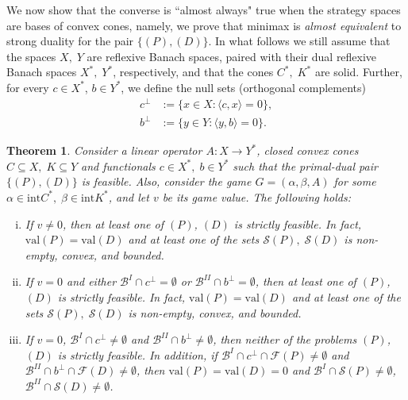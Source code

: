 \documentclass[11pt, twoside]{article}
\numberwithin{equation}{section}
\newtheorem{theorem}{Theorem}[section]
\theoremstyle{definition}
\begin{document}
We now show that the converse is ``almost always" true when the strategy spaces are bases of convex cones, namely, we prove that minimax is \textit{almost equivalent} to strong duality for the pair \hyperlink{primaldual}{$\{(P),(D)\}$}. In what follows we still assume that the spaces $X,\;Y$ are reflexive Banach spaces, paired with their dual reflexive Banach spaces $X^*,\;Y^*$, respectively, and that the cones $C^*,\;K^*$ are solid. Further, for every $c\in X^*$, $b\in Y^*$, we define the null sets (orthogonal complements)
\begin{subequations}
\begin{align}
c^{\perp}&:= \{x\in X:\langle c,x\rangle=0\},\\ 
b^{\perp}&:= \{y\in Y: \langle y,b\rangle=0\}.
\end{align}
\end{subequations}

\begin{theorem}\label{th:4.1}
    Consider a linear operator $A:X\rightarrow Y^*$, closed convex cones $C\subseteq X,\;K\subseteq Y$ and functionals $c\in X^*,\;b\in Y^*$ such that the primal-dual pair \hyperlink{primaldual}{$\{(P),(D)\}$} is feasible. Also, consider the game $G=(\alpha,\beta,A)$ for some $\alpha\in\text{int} C^*,\;\beta\in\text{int}K^*$, and let $v$ be its game value. The following holds:\vspace{-0.2cm}
    \begin{enumerate}[(i)]
        \item If $v\neq0$, then at least one of \hyperlink{primal}{$(P)$}, \hyperlink{dual}{$(D)$} is strictly feasible. In fact, $\text{val}(P)=\text{val}(D)$ and at least one of the sets $\mathcal{S}(P),\;\mathcal{S}(D)$ is non-empty, convex, and bounded.\vspace{-0.1cm}
        \item If $v=0$ and either $\mathcal{B}^{I}\cap c^{\perp}=\emptyset$ or $\mathcal{B}^{II}\cap b^{\perp}=\emptyset$, then at least one of \hyperlink{primal}{$(P)$}, \hyperlink{dual}{$(D)$} is strictly feasible. In fact, $\text{val}(P)=\text{val}(D)$ and at least one of the sets $\mathcal{S}(P),\;\mathcal{S}(D)$ is non-empty, convex, and bounded.\vspace{-0.1cm}
        \item If $v=0$, $\mathcal{B}^{I}\cap c^{\perp}\neq\emptyset$ and $\mathcal{B}^{II}\cap b^{\perp}\neq\emptyset$, then neither of the problems \hyperlink{primal}{$(P)$}, \hyperlink{dual}{$(D)$} is strictly feasible. In addition, if $\mathcal{B}^{I}\cap c^{\perp}\cap\mathcal{F}(P)\neq\emptyset$ and $\mathcal{B}^{II}\cap  b^{\perp}\cap\mathcal{F}(D)\neq\emptyset$, then $\text{val}(P)=\text{val}(D)=0$ and $\mathcal{B}^{I}\cap\mathcal{S}(P)\neq\emptyset$, $\mathcal{B}^{II}\cap\mathcal{S}(D)\neq\emptyset$.\\
    \end{enumerate}
\end{theorem}
\end{document}
